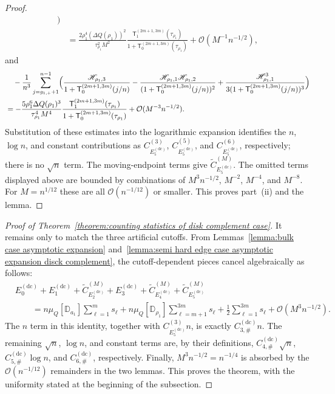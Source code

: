 \documentclass[a4paper]{article}
\numberwithin{equation}{section}
\begin{document}
\begin{proof}
\begin{align*}
\Bigr)
\\
&=
\frac{2\rho_1^4(\Delta Q(\rho_1))^2}{\tau_{\rho_1}^2M^2}
\frac{\mathsf{T}_{1}^{(2m+1,3m)}(\tau_{\rho_1})}{1+\mathsf{T}_{0}^{(2m+1,3m)}(\tau_{\rho_1})}
+\mathcal{O}(M^{-1}n^{-1/2}),
\end{align*}
and 
\begin{align*}
 &\quad 
 -\frac{1}{n^3}
\sum_{j=g_{1,+}+1}^{n-1}
\Bigl( 
\frac{\mathscr{H}_{\rho_1,3}}{1+\mathsf{T}_{0}^{(2m+1,3m)}(j/n)}
-\frac{\mathscr{H}_{\rho_1,1}\mathscr{H}_{\rho_1,2}}{(1+\mathsf{T}_{0}^{(2m+1,3m)}(j/n))^2}
+\frac{\mathscr{H}_{\rho_1,1}^3}{3(1+\mathsf{T}_{0}^{(2m+1,3m)}(j/n))^3}
\Bigr)
\\
&=
-
\frac{5\rho_1^6\Delta Q(\rho_1)^3}{\tau_{\rho_1}^4M^4}
\frac{\mathsf{T}_{1}^{(2m+1,3m)}(\tau_{\rho_1})}{1+\mathsf{T}_{0}^{(2m+1,3m)}(\tau_{\rho_1})}
+\mathcal{O}(M^{-3}n^{-1/2}). 
\end{align*}
Substitution of these estimates into the logarithmic expansion identifies the
$n$, $\log n$, and constant contributions as
$C_{E_5^{(\mathrm{dc})}}^{(3)}$,
$C_{E_5^{(\mathrm{dc})}}^{(5)}$, and
$C_{E_5^{(\mathrm{dc})}}^{(6)}$, respectively; there is no $\sqrt n$ term.
The moving-endpoint terms give
$\widetilde C_{E_5^{(\mathrm{dc})}}^{(M)}$.  The omitted terms displayed
above are bounded by combinations of
$M^3n^{-1/2}$, $M^{-2}$, $M^{-4}$, and $M^{-8}$.  For $M=n^{1/12}$ these
are all $\mathcal O(n^{-1/12})$ or smaller.  This proves part~(ii) and the
lemma.
\end{proof}

\begin{proof}[Proof of Theorem~\ref{theorem:counting statistics of disk complement case}]
It remains only to match the three artificial cutoffs.  From
Lemmas~\ref{lemma:bulk case asymptotic expansion}
and~\ref{lemma:semi hard edge case asymptotic expansion disck complement},
the cutoff-dependent pieces cancel algebraically as follows:
\begin{align*}
&E_0^{(\mathrm{dc})}+E_1^{(\mathrm{dc})}
+\widetilde C_{E_2^{(\mathrm{dc})}}^{(M)}+E_3^{(\mathrm{dc})}
+\widetilde C_{E_4^{(\mathrm{dc})}}^{(M)}
+\widetilde C_{E_5^{(\mathrm{dc})}}^{(M)}
\\
&\qquad=
n\mu_Q[\mathbb D_{a_1}]\sum_{\ell=1}^{m}s_\ell
+n\mu_Q[\mathbb D_{\rho_1}]\sum_{\ell=m+1}^{3m}s_\ell
+\frac12\sum_{\ell=1}^{3m}s_\ell
+\mathcal O(M^3n^{-1/2}).
\end{align*}
The $n$ term in this identity, together with
$C_{E_5^{(\mathrm{dc})}}^{(3)}n$, is exactly
$C_{3,\#}^{(\mathrm{dc})}n$.  The remaining $\sqrt n$, $\log n$, and
constant terms are, by their definitions,
$C_{4,\#}^{(\mathrm{dc})}\sqrt n$,
$C_{5,\#}^{(\mathrm{dc})}\log n$, and
$C_{6,\#}^{(\mathrm{dc})}$, respectively.  Finally,
$M^3n^{-1/2}=n^{-1/4}$ is absorbed by the
$\mathcal O(n^{-1/12})$ remainders in the two lemmas.  This proves the
theorem, with the uniformity stated at the beginning of the subsection.
\end{proof}
\end{document}
